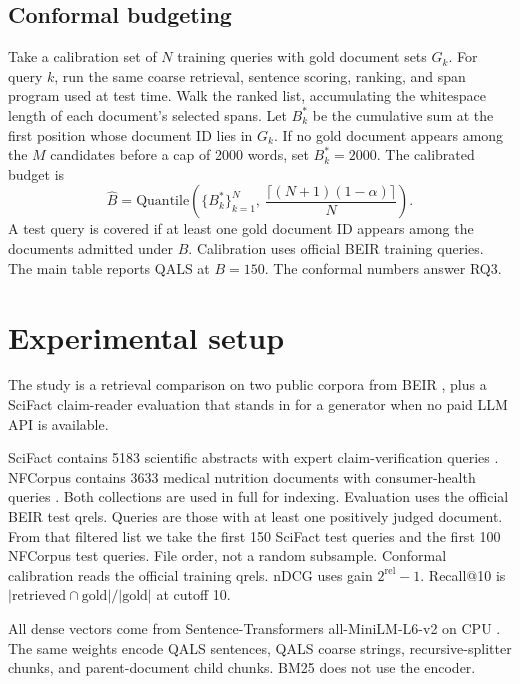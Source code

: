 \documentclass[preprint,12pt,authoryear]{elsarticle}
\begin{document}
\subsection{Conformal budgeting}
Take a calibration set of \(N\) training queries with gold document sets \(G_k\). For query \(k\), run the same coarse retrieval, sentence scoring, ranking, and span program used at test time. Walk the ranked list, accumulating the whitespace length of each document's selected spans. Let \(B_k^*\) be the cumulative sum at the first position whose document ID lies in \(G_k\). If no gold document appears among the \(M\) candidates before a cap of 2000 words, set \(B_k^*=2000\). The calibrated budget is
\begin{equation}
\hat{B}=\mathrm{Quantile}\left(\{B_k^*\}_{k=1}^{N},\ \frac{\lceil (N+1)(1-\alpha)\rceil}{N}\right).
\end{equation}
A test query is covered if at least one gold document ID appears among the documents admitted under \(\hat{B}\). Calibration uses official BEIR training queries. The main table reports QALS at \(B=150\). The conformal numbers answer RQ3.

\section{Experimental setup}
The study is a retrieval comparison on two public corpora from BEIR \citep{thakur2021beir}, plus a SciFact claim-reader evaluation that stands in for a generator when no paid LLM API is available.

SciFact contains 5183 scientific abstracts with expert claim-verification queries \citep{wadden2020fact}. NFCorpus contains 3633 medical nutrition documents with consumer-health queries \citep{boteva2016full}. Both collections are used in full for indexing. Evaluation uses the official BEIR test qrels. Queries are those with at least one positively judged document. From that filtered list we take the first 150 SciFact test queries and the first 100 NFCorpus test queries. File order, not a random subsample. Conformal calibration reads the official training qrels. nDCG uses gain \(2^{\mathrm{rel}}-1\). Recall@10 is \(|\mathrm{retrieved}\cap\mathrm{gold}|/|\mathrm{gold}|\) at cutoff 10.

All dense vectors come from Sentence-Transformers all-MiniLM-L6-v2 on CPU \citep{reimers2019sentence}. The same weights encode QALS sentences, QALS coarse strings, recursive-splitter chunks, and parent-document child chunks. BM25 does not use the encoder.
\end{document}
